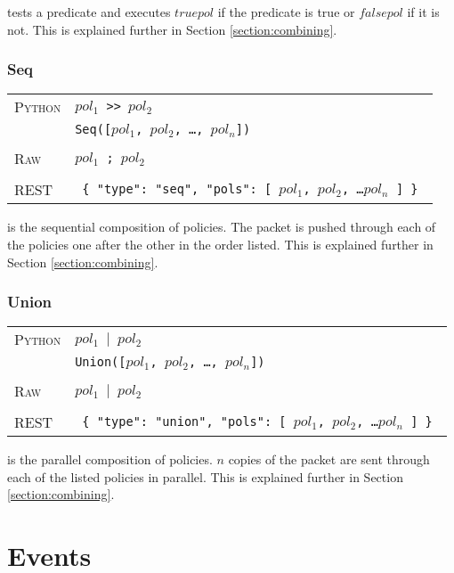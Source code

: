 tests a predicate and executes $truepol$ if the predicate is true or $falsepol$ if it
is not.  This is explained further in Section \ref{section:combining}.


\subsubsection{Seq}

\bigskip
\begin{tabularx}{\linewidth}{lX}
\textsc{Python}   & \texttt{$pol_1$ >> $pol_2$} \\
    & \texttt{Seq([$pol_1$, $pol_2$, \ldots, $pol_n$])} \\ \\
\textsc{Raw}    & \texttt{$pol_1$ ;  $pol_2$}  \\ \\
\textsc{REST} & \texttt{ \{ "type": "seq", "pols": [ $pol_1$, $pol_2$, \ldots $pol_n$ ] \} } 
\end{tabularx}

 is the sequential composition of policies.  The packet is pushed through each of the
policies one after the other in the order listed.  This is explained further in Section \ref{section:combining}.

\subsubsection{Union}

\bigskip
\begin{tabularx}{\linewidth}{lX}
\textsc{Python}   & \texttt{$pol_1$ $\vert$ $pol_2$} \\
    & \texttt{Union([$pol_1$, $pol_2$, \ldots, $pol_n$])} \\ \\
\textsc{Raw}    & \texttt{$pol_1$ $\vert$  $pol_2$}  \\ \\
\textsc{REST} & \texttt{ \{ "type": "union", "pols": [ $pol_1$, $pol_2$, \ldots $pol_n$ ] \} } 
\end{tabularx}

 is the parallel composition of policies.  $n$ copies of the packet are sent through
each of the listed policies in parallel.  This is explained further in Section \ref{section:combining}.

\section{Events}
\label{netkat_reference:events}

